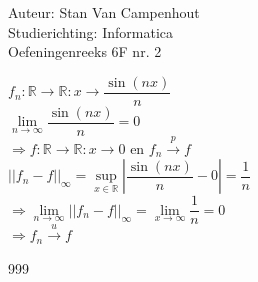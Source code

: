 \documentclass[a4paper]{article}
\begin{document}
  
\noindent \large Auteur: Stan Van Campenhout \\
\noindent \large Studierichting:  Informatica\\
\noindent \large Oefeningenreeks 6F nr. 2\\

\medskip

\normalsize

$ f_n : \mathbb{R} \rightarrow \mathbb{R}  : x \rightarrow \dfrac{\sin(nx)}{n} $\\

$ \lim\limits_{n \rightarrow \infty} \dfrac{\sin(nx)}{n} = 0 $\\

$ \Rightarrow f : \mathbb{R} \rightarrow \mathbb{R} : x \rightarrow 0 $ en $  f_n \stackrel{p}{\rightarrow} f $\\

$ \left|\left|f_n - f \right|\right|_{\infty} = \sup\limits_{x \in \mathbb{R}}\left|\dfrac{\sin(nx)}{n} - 0 \right| = \dfrac{1}{n} $\\

$ \Rightarrow \lim\limits_{n \rightarrow \infty}\left|\left|f_n - f \right|\right|_{\infty} = \lim\limits_{x \rightarrow \infty}\dfrac{1}{n} = 0 $\\

$ \Rightarrow f_n \stackrel{u}{\rightarrow} f $\\

\begin{thebibliography}{999}
\end{thebibliography}
\end{document}
